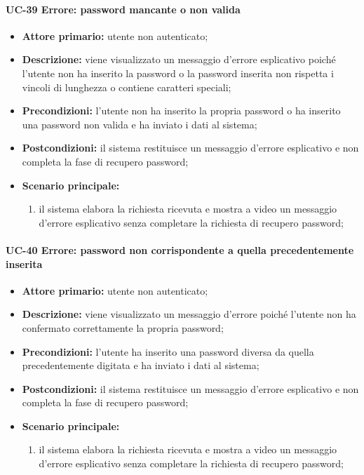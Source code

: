 \paragraph{UC-39 Errore: password mancante o non valida}

	\begin{itemize}
		\item \textbf{Attore primario:} utente non autenticato;

		\item \textbf{Descrizione:} viene visualizzato un messaggio d'errore esplicativo poiché l'utente non ha inserito la password o la password inserita non rispetta i vincoli di lunghezza o contiene caratteri speciali;

		\item \textbf{Precondizioni:} l'utente non ha inserito la propria password o ha inserito una password non valida e ha inviato i dati al sistema;

		\item \textbf{Postcondizioni:} il sistema restituisce un messaggio d'errore esplicativo e non completa la fase di recupero password;

		\item \textbf{Scenario principale:}
	  		\begin{enumerate}
		  		\item il sistema elabora la richiesta ricevuta e mostra a video un messaggio d'errore esplicativo senza completare la richiesta di recupero password; 
	  		\end{enumerate}
	\end{itemize}

\paragraph{UC-40 Errore: password non corrispondente a quella precedentemente inserita}

	\begin{itemize}
		\item \textbf{Attore primario:} utente non autenticato;

		\item \textbf{Descrizione:}  viene visualizzato un messaggio d'errore poiché l'utente non ha confermato correttamente la propria password;

		\item \textbf{Precondizioni:} l'utente ha inserito una password diversa da quella precedentemente digitata e ha inviato i dati al sistema;

		\item \textbf{Postcondizioni:} il sistema restituisce un messaggio d'errore esplicativo e non completa la fase di recupero password;

		\item \textbf{Scenario principale:}
	  		\begin{enumerate}
		  		\item il sistema elabora la richiesta ricevuta e mostra a video un messaggio d'errore esplicativo senza completare la richiesta di recupero password; 
	  		\end{enumerate}
	\end{itemize}

